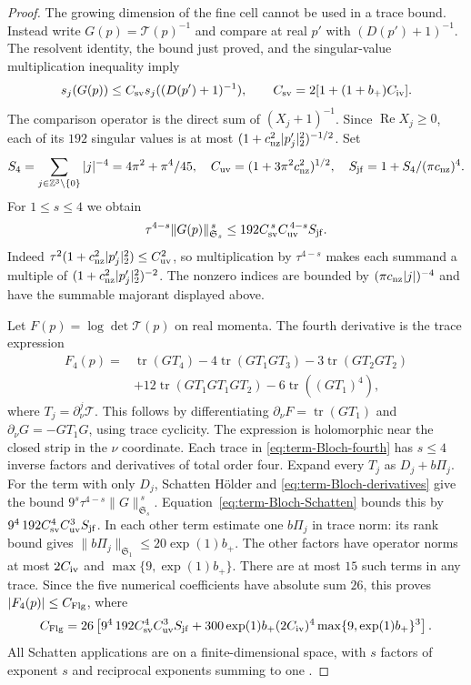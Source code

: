 \documentclass[11pt,letterpaper,reqno]{amsart}
\newcommand{\Z}{\mathbb Z}
\DeclareMathOperator{\tr}{tr}
\begin{document}
\begin{proof}
The growing dimension of the fine cell cannot be used
in a trace bound. Instead write $G(p)=\mathcal T(p)^{-1}$
and compare at real $p'$ with $(D(p')+1)^{-1}$.
The resolvent identity, the bound just proved, and the
singular-value multiplication inequality
\cite[slides~3--9]{PongeSchatten2025} imply
\[
 s_j(G(p))\le C_{\rm sv}s_j((D(p')+1)^{-1}),\qquad
 C_{\rm sv}=2[1+(1+b_+)C_{\rm iv}].
\]
The comparison operator is the direct sum of
$(X_j+1)^{-1}$. Since $\operatorname{Re}X_j\ge0$,
each of its $192$ singular values is at most
$(1+c_{\rm nz}^2|p'_j|_2^2)^{-1/2}$.
Set
\[
 S_4=\sum_{j\in\Z^3\setminus\{0\}}|j|^{-4}
        =4\pi^2+\pi^4/45,\quad
 C_{\rm uv}=(1+3\pi^2c_{\rm nz}^2)^{1/2},\quad
 S_{\rm jf}=1+S_4/(\pi c_{\rm nz})^4.
\]
For $1\le s\le4$ we obtain
\begin{equation}\label{eq:term-Bloch-Schatten}
 \tau^{4-s}\|G(p)\|_{\mathfrak S_s}^{\,s}
           \le192C_{\rm sv}^{\,s}C_{\rm uv}^{\,4-s}S_{\rm jf}.
\end{equation}
Indeed
$\tau^2(1+c_{\rm nz}^2|p'_j|_2^2)\le C_{\rm uv}^2$,
so multiplication by $\tau^{4-s}$ makes each summand
a multiple of $(1+c_{\rm nz}^2|p'_j|_2^2)^{-2}$.
The nonzero indices are bounded by
$(\pi c_{\rm nz}|j|)^{-4}$ and have the summable
majorant displayed above.

Let $F(p)=\log\det\mathcal T(p)$ on real momenta.
The fourth derivative is the trace expression
\begin{align}
 F_4(p)={}&\tr(GT_4)-4\tr(GT_1GT_3)
                  -3\tr(GT_2GT_2)\nonumber\\
          &+12\tr(GT_1GT_1GT_2)-6\tr((GT_1)^4),
                                      \label{eq:term-Bloch-fourth}
\end{align}
where $T_j=\partial_\nu^j\mathcal T$.
This follows by differentiating
$\partial_\nu F=\tr(GT_1)$ and
$\partial_\nu G=-GT_1G$, using trace cyclicity.
The expression is holomorphic near the closed strip
in the $\nu$ coordinate.
Each trace in \eqref{eq:term-Bloch-fourth} has $s\le4$
inverse factors and derivatives of total order four.
Expand every $T_j$ as $D_j+b\Pi_j$.
For the term with only $D_j$, Schatten Hölder and
\eqref{eq:term-Bloch-derivatives} give the bound
$9^s\tau^{4-s}\|G\|_{\mathfrak S_s}^{\,s}$.
Equation~\eqref{eq:term-Bloch-Schatten} bounds this by
$9^4\,192C_{\rm sv}^4C_{\rm uv}^3S_{\rm jf}$.
In each other term estimate one $b\Pi_j$ in trace norm:
its rank bound gives $\|b\Pi_j\|_{\mathfrak S_1}
\le20\exp(1)b_+$. The other factors have operator
norms at most $2C_{\rm iv}$ and
$\max\{9,\exp(1)b_+\}$.
There are at most $15$ such terms in any trace.
Since the five numerical coefficients have absolute
sum $26$, this proves $|F_4(p)|\le C_{\rm Flg}$, where
\[
 C_{\rm Flg}=26\left[
       9^4\,192C_{\rm sv}^4C_{\rm uv}^3S_{\rm jf}
       +300\exp(1)b_+(2C_{\rm iv})^4
                           \max\{9,\exp(1)b_+\}^3\right].
\]
All Schatten applications are on a finite-dimensional
space, with $s$ factors of exponent $s$ and reciprocal
exponents summing to one
\cite[slides~54--56]{PongeSchatten2025}.


\end{proof}
\end{document}
